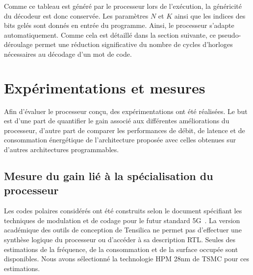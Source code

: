 Comme ce tableau est généré par le processeur lors de l'exécution, la généricité du décodeur est donc conservée. Les paramètres $N$ et $K$ ainsi que les indices des bits gelés sont donnés en entrée du programme. Ainsi, le processeur s'adapte automatiquement. Comme cela est détaillé dans la section suivante, ce pseudo-déroulage permet une réduction significative du nombre de cycles d'horloges nécessaires au décodage d'un mot de code.


\section{Expérimentations et mesures}
\label{sec:tensilica_res}
Afin d'évaluer le processeur conçu, des expérimentations ont été réalisées. Le but est d'une part de quantifier le gain associé aux différentes améliorations du processeur, d'autre part de comparer les performances de débit, de latence et de consommation énergétique de l'architecture proposée avec celles obtenues sur d'autres architectures programmables.
\subsection{Mesure du gain lié à la spécialisation du processeur}

Les codes polaires considérés ont été construits selon le document spécifiant les techniques de modulation et de codage pour le futur standard 5G~\cite{3gpp_ts_2017}. 
La version académique des outils de conception de Tensilica ne permet pas d'effectuer une synthèse logique du processeur ou d'accéder à sa description RTL. Seules des estimations de la fréquence, de la consommation et de la surface occupée sont disponibles. Nous avons sélectionné la technologie HPM 28nm de TSMC pour ces estimations.

